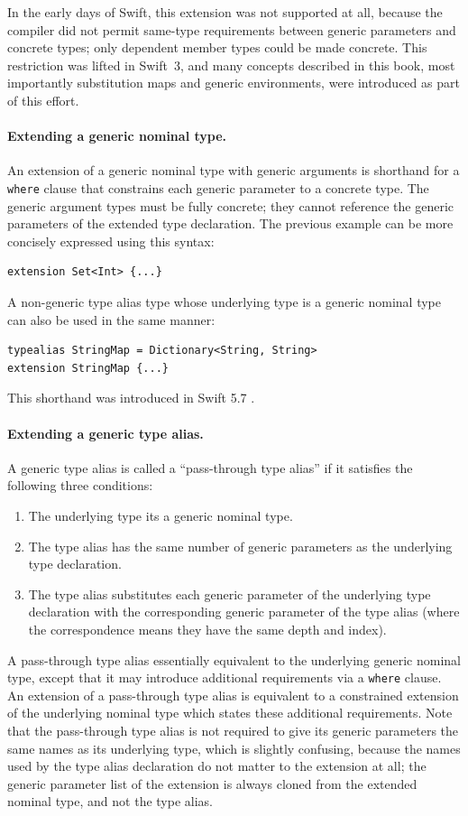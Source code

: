 \documentclass[../generics]{subfiles}
\begin{document}
In the early days of Swift, this extension was not supported at all, because the compiler did not permit same-type requirements between generic parameters and concrete types; only dependent member types could be made concrete. This restriction was lifted in Swift~3, and many concepts described in this book, most importantly substitution maps and generic environments, were introduced as part of this effort.

\paragraph{Extending a generic nominal type.} An extension of a generic nominal type with generic arguments is shorthand for a \texttt{where} clause that constrains each generic parameter to a concrete type. The generic argument types must be fully concrete; they cannot reference the generic parameters of the extended type declaration. The previous example can be more concisely expressed using this syntax:
\begin{Verbatim}
extension Set<Int> {...}
\end{Verbatim}
A non-generic type alias type whose underlying type is a generic nominal type can also be used in the same manner:
\begin{Verbatim}
typealias StringMap = Dictionary<String, String>
extension StringMap {...}
\end{Verbatim}
This shorthand was introduced in Swift 5.7 \cite{se0361}.

\paragraph{Extending a generic type alias.}
A generic type alias is called a ``pass-through type alias'' if it satisfies the following three conditions:
\begin{enumerate}
\item The underlying type its a generic nominal type.
\item The type alias has the same number of generic parameters as the underlying type declaration.
\item The type alias substitutes each generic parameter of the underlying type declaration with the corresponding generic parameter of the type alias (where the correspondence means they have the same depth and index).
\end{enumerate}
A pass-through type alias essentially equivalent to the underlying generic nominal type, except that it may introduce additional requirements via a \texttt{where} clause. An extension of a pass-through type alias is equivalent to a constrained extension of the underlying nominal type which states these additional requirements. Note that the pass-through type alias is not required to give its generic parameters the same names as its underlying type, which is slightly confusing, because the names used by the type alias declaration do not matter to the extension at all; the generic parameter list of the extension is always cloned from the extended nominal type, and not the type alias.
\end{document}
